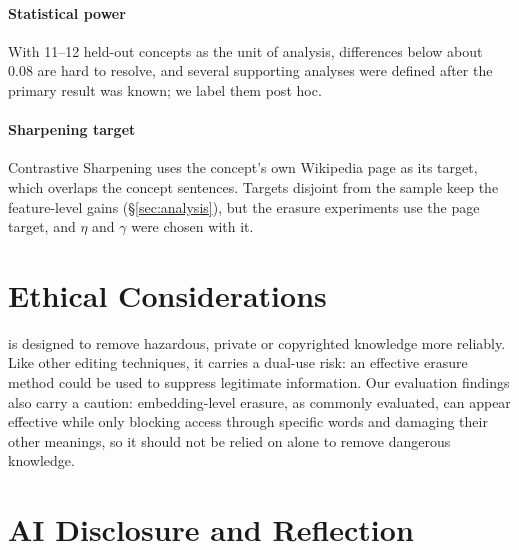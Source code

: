\paragraph{Statistical power}
With 11--12 held-out concepts as the unit of analysis, differences below about 0.08 are hard to resolve, and several supporting analyses were defined after the primary result was known; we label them post hoc.

\paragraph{Sharpening target}
Contrastive Sharpening uses the concept's own Wikipedia page as its target, which overlaps the concept sentences. Targets disjoint from the sample keep the feature-level gains (\S\ref{sec:analysis}), but the erasure experiments use the page target, and $\eta$ and $\gamma$ were chosen with it.

\section*{Ethical Considerations}

\cinder{} is designed to remove hazardous, private or copyrighted knowledge more reliably.
Like other editing techniques, it carries a dual-use risk: an effective erasure method could be used to suppress legitimate information.
Our evaluation findings also carry a caution: embedding-level erasure, as commonly evaluated, can appear effective while only blocking access through specific words and damaging their other meanings, so it should not be relied on alone to remove dangerous knowledge.

\section*{AI Disclosure and Reflection}

